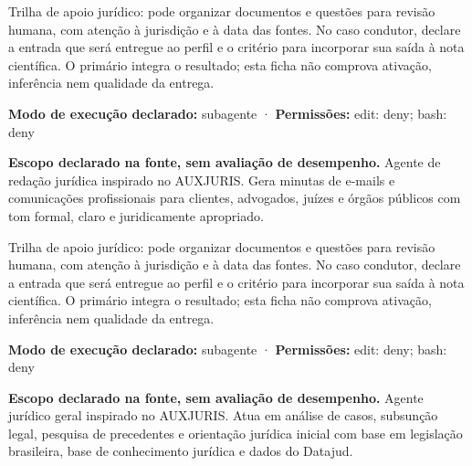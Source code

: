 \begin{funcao}
Trilha de apoio jurídico: pode organizar documentos e questões para revisão humana, com atenção à jurisdição e à data das fontes. No caso condutor, declare a entrada que será entregue ao perfil e o critério para incorporar sua saída à nota científica. O primário integra o resultado; esta ficha não comprova ativação, inferência nem qualidade da entrega.
\end{funcao}

\begin{arquitetura}
\textbf{Modo de execução declarado:} subagente · \textbf{Permissões:} edit: deny; bash: deny
\end{arquitetura}


\begin{descricao}
\textbf{Escopo declarado na fonte, sem avaliação de desempenho.}
Agente de redação jurídica inspirado no AUXJURIS. Gera minutas de e-mails e comunicações profissionais para clientes, advogados, juízes e órgãos públicos com tom formal, claro e juridicamente apropriado.
\end{descricao}

\begin{funcao}
Trilha de apoio jurídico: pode organizar documentos e questões para revisão humana, com atenção à jurisdição e à data das fontes. No caso condutor, declare a entrada que será entregue ao perfil e o critério para incorporar sua saída à nota científica. O primário integra o resultado; esta ficha não comprova ativação, inferência nem qualidade da entrega.
\end{funcao}

\begin{arquitetura}
\textbf{Modo de execução declarado:} subagente · \textbf{Permissões:} edit: deny; bash: deny
\end{arquitetura}


\begin{descricao}
\textbf{Escopo declarado na fonte, sem avaliação de desempenho.}
Agente jurídico geral inspirado no AUXJURIS. Atua em análise de casos, subsunção legal, pesquisa de precedentes e orientação jurídica inicial com base em legislação brasileira, base de conhecimento jurídica e dados do Datajud.
\end{descricao}

